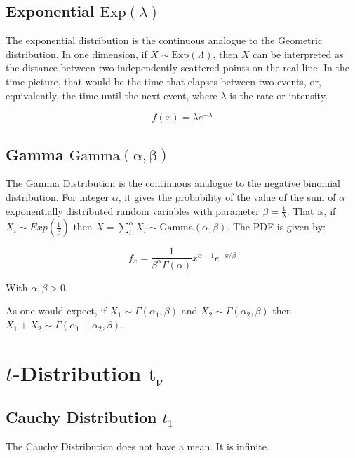 \subsection{Exponential $\mathrm{Exp}(\lambda)$}
The exponential distribution is the continuous analogue to the Geometric distribution. In one dimension, if $X \sim \mathrm{Exp}(\Lambda)$, then $X$ can be interpreted as the distance between two independently scattered points on the real line. In the time picture, that would be the time that elapses between two events, or, equivalently, the time until the next event, where $\lambda$ is the rate or intensity.

\begin{equation}
f(x) = \lambda e^{-\lambda}
\end{equation}


\subsection{Gamma $\mathrm{Gamma(\alpha,\beta)}$}
The Gamma Distribution is the continuous analogue to the negative binomial distribution. For integer $\alpha$, it gives the probability of the value of the sum of $\alpha$ exponentially distributed random variables with parameter $\beta=\frac{1}{\lambda}$. That is, if $X_i \sim Exp(\frac{1}{\beta})$ then $X = \sum_i^\alpha X_i \sim \mathrm{Gamma}(\alpha,\beta)$. The PDF is given by:

\begin{equation}
f_x = \frac{1}{\beta^\alpha \Gamma(\alpha)}x^{\alpha-1}e^{-x/\beta}
\end{equation}

With $\alpha,\beta > 0$.

As one would expect, if $X_1 \sim \Gamma(\alpha_1,\beta)$ and $X_2 \sim \Gamma(\alpha_2,\beta)$ then $X_1 + X_2 \sim \Gamma(\alpha_1+\alpha_2,\beta)$. 



\section{$t$-Distribution $\mathrm{t_\nu\ }$}

\subsection{Cauchy Distribution $t_1$}
The Cauchy Distribution does not have a mean. It is infinite.



